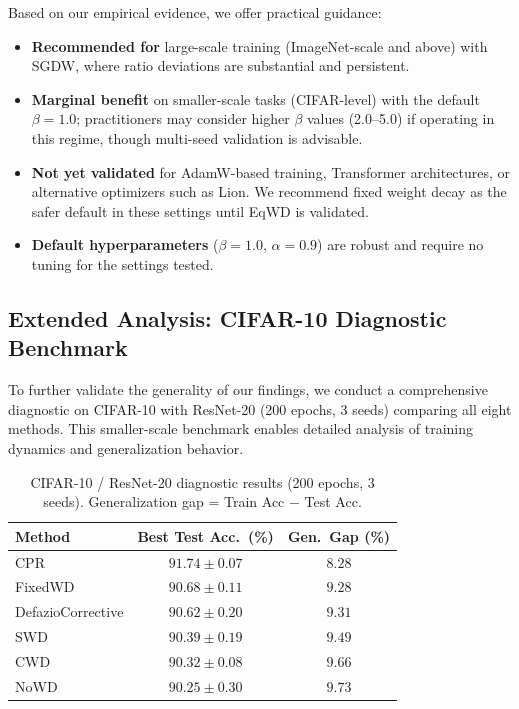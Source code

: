 \documentclass{article}
\begin{document}
Based on our empirical evidence, we offer practical guidance:

\begin{itemize}
\item
  \textbf{Recommended for} large-scale training (ImageNet-scale and
  above) with SGDW, where ratio deviations are substantial and
  persistent.
\item
  \textbf{Marginal benefit} on smaller-scale tasks (CIFAR-level) with
  the default $\beta = 1.0$; practitioners may consider higher
  $\beta$ values (2.0--5.0) if operating in this regime, though
  multi-seed validation is advisable.
\item
  \textbf{Not yet validated} for AdamW-based training, Transformer
  architectures, or alternative optimizers such as Lion. We recommend
  fixed weight decay as the safer default in these settings until EqWD
  is validated.
\item
  \textbf{Default hyperparameters} ($\beta = 1.0$, $\alpha = 0.9$)
  are robust and require no tuning for the settings tested.
\end{itemize}


\subsection{Extended Analysis: CIFAR-10 Diagnostic Benchmark}
\label{sec:cifar10}

To further validate the generality of our findings, we conduct a
comprehensive diagnostic on CIFAR-10 with ResNet-20 (200 epochs, 3
seeds) comparing all eight methods. This smaller-scale benchmark enables
detailed analysis of training dynamics and generalization behavior.

\begin{table}[t]
\centering
\caption{CIFAR-10 / ResNet-20 diagnostic results (200 epochs, 3 seeds). Generalization gap = Train Acc $-$ Test Acc.}
\label{tab:cifar10}
\small
\begin{tabular}{lcc}
\toprule
Method & Best Test Acc.\ (\%) & Gen.\ Gap (\%) \\
\midrule
CPR \citep{franke2024cpr} & $\mathbf{91.74 \pm 0.07}$ & $\mathbf{8.28}$ \\
FixedWD & $90.68 \pm 0.11$ & $9.28$ \\
DefazioCorrective \citep{defazio2025} & $90.62 \pm 0.20$ & $9.31$ \\
SWD \citep{xie2023swd} & $90.39 \pm 0.19$ & $9.49$ \\
CWD \citep{chen2026cwd} & $90.32 \pm 0.08$ & $9.66$ \\
NoWD & $90.25 \pm 0.30$ & $9.73$ \\
\bottomrule
\end{tabular}
\end{table}
\end{document}
